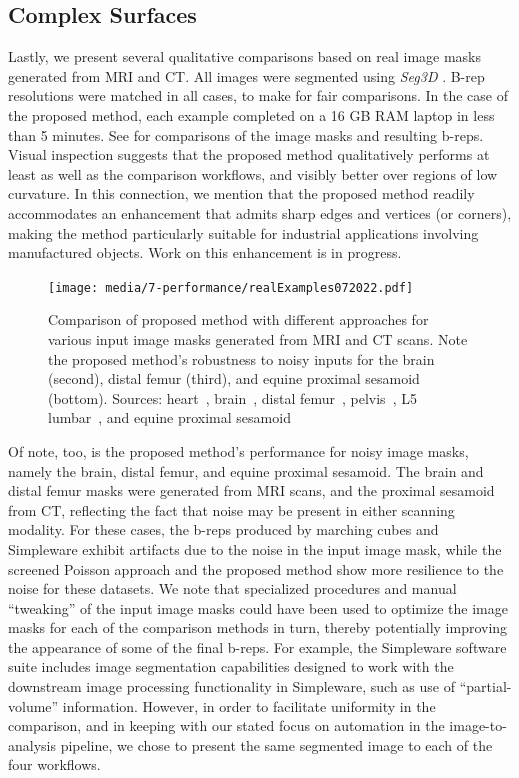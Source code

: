 \subsection{Complex Surfaces}
\label{Complex Surfaces}

Lastly, we present several qualitative comparisons based on real image masks generated from MRI and CT.  All images were segmented using \textit{Seg3D} \cite{Seg3D}.  B-rep resolutions were matched in all cases, to make for fair comparisons.  In the case of the proposed method, each example completed on a 16 GB RAM laptop in less than 5 minutes. See  for comparisons of the image masks and resulting b-reps.  Visual inspection suggests that the proposed method qualitatively performs at least as well as the comparison workflows, and visibly better over regions of low curvature.   In this connection, we mention that the proposed method readily accommodates an enhancement that admits sharp edges and vertices (or corners), making the method particularly suitable for industrial applications involving manufactured objects.  Work on this enhancement is in progress.  
\begin{figure}[h!]
	\centering
	 \texttt{[image: media/7-performance/realExamples072022.pdf]}
	\caption{{Comparison of proposed method with different approaches for various input image masks generated from MRI and CT scans. Note the proposed method's robustness to noisy inputs for the brain (second), distal femur (third), and equine proximal sesamoid (bottom). Sources: heart~\cite{cvgg}, brain~\cite{marcus_2007}, distal femur~\cite{epperson_2013}, pelvis~\cite{clark_2013}, L5 lumbar~\cite{yao_2016}, and equine proximal sesamoid~\cite{shaffer2021}}}
	\label{fig:example-meshes}
\end{figure}

Of note, too, is the proposed method's performance for noisy image masks, namely the brain, distal femur, and equine proximal sesamoid. The brain and distal femur masks were generated from MRI scans, and the proximal sesamoid from CT, reflecting the fact that noise may be present in either scanning modality.  For these cases, the b-reps produced by marching cubes and Simpleware exhibit artifacts due to the noise in the input image mask, while the screened Poisson approach and the proposed method show more resilience to the noise for these datasets.  We note that specialized procedures and manual ``tweaking'' of the input image masks could have been used to optimize the image masks for each of the comparison methods in turn, thereby potentially improving the appearance of some of the final b-reps.  For example, the Simpleware software suite includes image segmentation capabilities designed to work with the downstream image processing functionality in Simpleware, such as use of ``partial-volume'' information.  However, in order to facilitate uniformity in the comparison, and in keeping with our stated focus on automation in the image-to-analysis pipeline, we chose to present the same segmented image to each of the four workflows.


